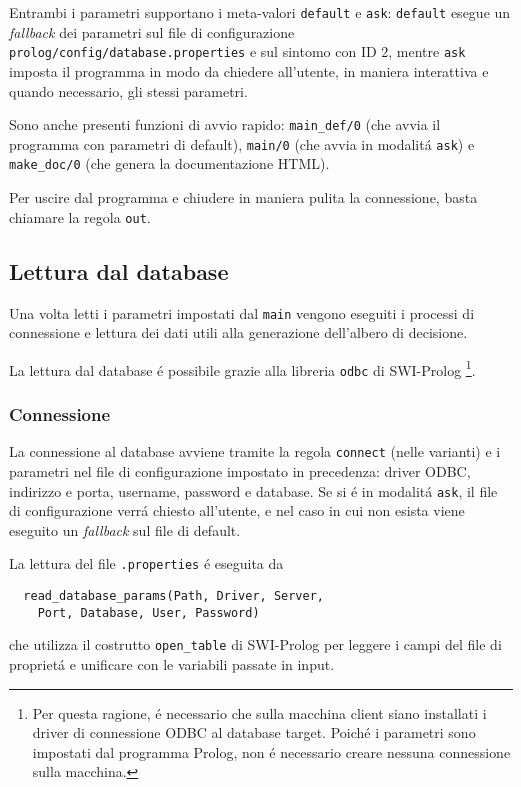 \documentclass[preprint]{acm_proc_article-sp}
\begin{document}

Entrambi i parametri supportano i meta-valori \verb|default| e \verb|ask|: \verb|default| esegue un \textit{fallback} dei parametri sul file di configurazione \texttt{prolog/config/database.properties} e sul sintomo con ID $2$, mentre \verb|ask| imposta il programma in modo da chiedere all'utente, in maniera interattiva e quando necessario, gli stessi parametri.

Sono anche presenti funzioni di avvio rapido: \verb|main_def/0| (che avvia il programma con parametri di default), \verb|main/0| (che avvia in modalit\'a \verb|ask|) e \verb|make_doc/0| (che genera la documentazione HTML).

Per uscire dal programma e chiudere in maniera pulita la connessione, basta chiamare la regola \verb|out|.

\subsection{Lettura dal database}
\label{prolog-database}
Una volta letti i parametri impostati dal \verb|main| vengono eseguiti i processi di connessione e lettura dei dati utili alla generazione dell'albero di decisione.

La lettura dal database \'e possibile grazie alla libreria \verb|odbc| di SWI-Prolog \footnote{Per questa ragione, \'e necessario che sulla macchina client siano installati i driver di connessione ODBC al database target. Poich\'e i parametri sono impostati dal programma Prolog, non \'e necessario creare nessuna connessione sulla macchina.}.

\subsubsection{Connessione}
La connessione al database avviene tramite la regola \verb|connect| (nelle varianti) e i parametri nel file di configurazione impostato in precedenza: driver ODBC, indirizzo e porta, username, password e database. Se si \'e in modalit\'a \verb|ask|, il file di configurazione verr\'a chiesto all'utente, e nel caso in cui non esista viene eseguito un \textit{fallback} sul file di default.

La lettura del file \verb|.properties| \'e eseguita da
\begin{verbatim}
  read_database_params(Path, Driver, Server, 
  	Port, Database, User, Password)
\end{verbatim}
che utilizza il costrutto \verb|open_table| di SWI-Prolog per leggere i campi del file di propriet\'a e unificare con le variabili passate in input.
\end{document}
